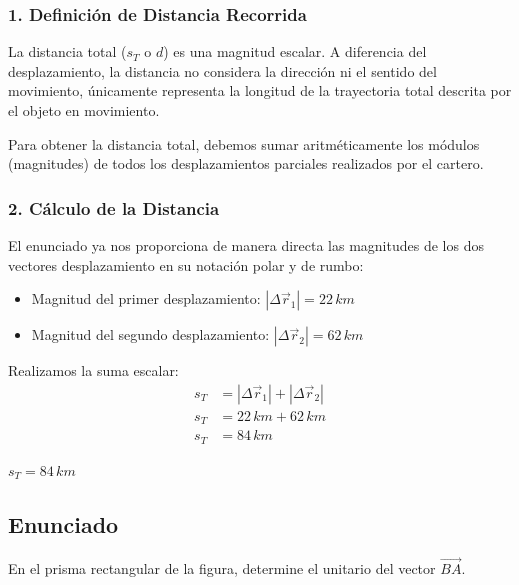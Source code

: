 \documentclass[12pt, a4paper]{article}
\begin{document}
\subsubsection*{1. Definición de Distancia Recorrida}
La distancia total ($s_T$ o $d$) es una magnitud escalar. A diferencia del desplazamiento, la distancia no considera la dirección ni el sentido del movimiento, únicamente representa la longitud de la trayectoria total descrita por el objeto en movimiento. 

Para obtener la distancia total, debemos sumar aritméticamente los módulos (magnitudes) de todos los desplazamientos parciales realizados por el cartero.

\subsubsection*{2. Cálculo de la Distancia}
El enunciado ya nos proporciona de manera directa las magnitudes de los dos vectores desplazamiento en su notación polar y de rumbo:
\begin{itemize}
    \item Magnitud del primer desplazamiento: $|\Delta\vec{r}_1| = 22 \, \si{km}$
    \item Magnitud del segundo desplazamiento: $|\Delta\vec{r}_2| = 62 \, \si{km}$
\end{itemize}

Realizamos la suma escalar:
\begin{align*}
    s_T &= |\Delta\vec{r}_1| + |\Delta\vec{r}_2| \\
    s_T &= 22 \, \si{km} + 62 \, \si{km} \\
    s_T &= 84 \, \si{km}
\end{align*}

\begin{tcolorbox}[colback=green!5!white, colframe=green!50!black, title=Respuesta Final]
\centering \Large $s_T = 84 \, \si{km}$
\end{tcolorbox}

\newpage

\subsection*{Enunciado}
En el prisma rectangular de la figura, determine el unitario del vector $\vec{BA}$.
\end{document}
